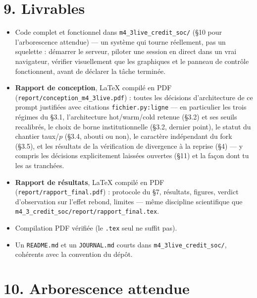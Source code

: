 \documentclass[11pt,a4paper]{article}
\newcommand{\code}[1]{\texttt{#1}}
\begin{document}
\section*{9. Livrables}

\begin{itemize}
\item Code complet et fonctionnel dans \code{m4\_3live\_credit\_soc/}
  (\S10 pour l'arborescence attendue) --- un système qui tourne
  réellement, pas un squelette : démarrer le serveur, piloter une
  session en direct dans un vrai navigateur, vérifier visuellement que
  les graphiques et le panneau de contrôle fonctionnent, avant de
  déclarer la tâche terminée.
\item \textbf{Rapport de conception}, \LaTeX{} compilé en PDF
  (\code{report/conception\_m4\_3live.pdf}) : toutes les décisions
  d'architecture de ce prompt justifiées avec citations
  \code{fichier.py:ligne} --- en particulier les trois régimes du \S3.1,
  l'architecture hot/warm/cold retenue (\S3.2) et ses seuils
  recalibrés, le choix de borne institutionnelle (\S3.2, dernier
  point), le statut du chantier taux/$p$ (\S3.4, abouti ou non), le
  caractère indépendant du fork (\S3.5), et les résultats de la
  vérification de divergence à la reprise (\S4) --- y compris les
  décisions explicitement laissées ouvertes (\S11) et la façon dont tu
  les as tranchées.
\item \textbf{Rapport de résultats}, \LaTeX{} compilé en PDF
  (\code{report/rapport\_final.pdf}) : protocole du \S7, résultats,
  figures, verdict d'observation sur l'effet rebond, limites --- même
  discipline scientifique que
  \code{m4\_3\_credit\_soc/report/rapport\_final.tex}.
\item Compilation PDF vérifiée (le \code{.tex} seul ne suffit pas).
\item Un \code{README.md} et un \code{JOURNAL.md} courts dans
  \code{m4\_3live\_credit\_soc/}, cohérents avec la convention du dépôt.
\end{itemize}

\section*{10. Arborescence attendue}
\end{document}
